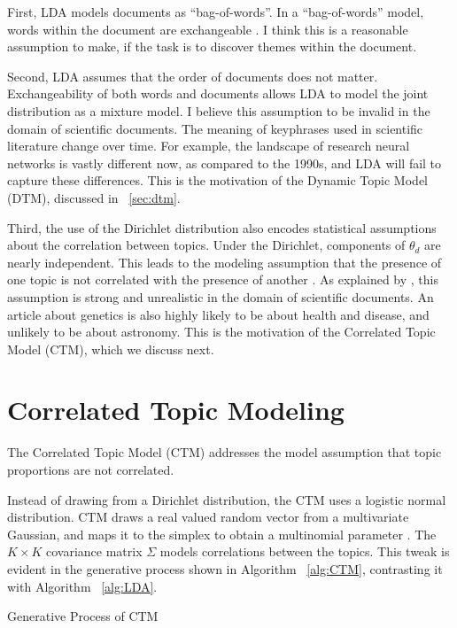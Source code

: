 \documentclass[letterpaper]{article}
\begin{document}
First, LDA models documents as ``bag-of-words''. In a ``bag-of-words''
model, words within the document are exchangeable
\cite{blei2003latent}. I think this is a reasonable assumption to
make, if the task is to discover themes within the document.

Second, LDA assumes that the order of documents does not matter.
Exchangeability of both words and documents allows LDA to model the
joint distribution as a mixture model. I believe this assumption to be
invalid in the domain of scientific documents. The meaning of
keyphrases used in scientific literature change over time. For
example, the landscape of research neural networks is vastly different
now, as compared to the 1990s, and LDA will fail to capture these
differences. This is the motivation of the Dynamic Topic Model (DTM),
discussed in ~\autoref{sec:dtm}.

Third, the use of the Dirichlet distribution also encodes statistical
assumptions about the correlation between topics. Under the Dirichlet,
components of $\theta_d$ are nearly independent. This leads to the
modeling assumption that the presence of one topic is not correlated
with the presence of another \cite{blei2005correlated}. As explained
by \citeauthor{blei2005correlated}, this assumption is strong and
unrealistic in the domain of scientific documents. An article about
genetics is also highly likely to be about health and disease, and
unlikely to be about astronomy. This is the motivation of the
Correlated Topic Model (CTM), which we discuss next.

\section{Correlated Topic Modeling}
\label{sec:ctm}
The Correlated Topic Model (CTM) addresses the model assumption that
topic proportions are not correlated.

Instead of drawing from a Dirichlet distribution, the CTM uses a
logistic normal distribution. CTM draws a real valued random vector
from a multivariate Gaussian, and maps it to the simplex to obtain a
multinomial parameter \cite{blei2005correlated}. The $K \times K$
covariance matrix $\Sigma$ models correlations between the topics.
This tweak is evident in the generative process shown in Algorithm
~\autoref{alg:CTM}, contrasting it with Algorithm ~\autoref{alg:LDA}.

\begin{algorithm}
  \caption{Generative Process of CTM}\label{alg:CTM}
  \begin{algorithmic}[1]
    \EndFor
    \EndFor
  \end{algorithmic}
\end{algorithm}
\end{document}
